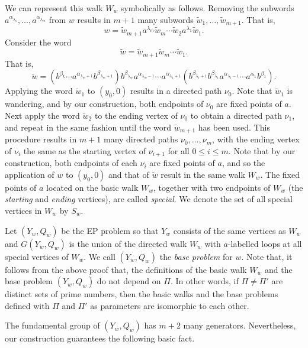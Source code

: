 \documentclass[10pt,a4paper]{amsart}
\theoremstyle{definition}
\theoremstyle{definition}
\numberwithin{equation}{section}
\begin{document}
We can represent this walk $W_w$ symbolically as follows. Removing the subwords $a^{\alpha_{\lambda_1}}, \dots, a^{\alpha_{\lambda_m}}$ from $w$ results in $m+1$ many subwords $\tilde{w}_1, \dots, \tilde{w}_{m+1}$. That is,
$$ w=\tilde{w}_{m+1}a^{\lambda_m}\tilde{w}_m\cdots \tilde{w}_2a^{\lambda_1}\tilde{w}_1. $$
Consider the word
$$ \tilde{w}=\tilde{w}_{m+1}\tilde{w}_m\cdots \tilde{w}_1. $$
That is,
\begin{equation}\label{eqn:tildew} \tilde{w}=(b^{\beta_k}\cdots a^{\alpha_{\lambda_m+1}}b^{\beta_{\lambda_m+1}})b^{\beta_{\lambda_m}}a^{\alpha_{\lambda_m-1}}\cdots a^{\alpha_{\lambda_1+1}}(b^{\beta_{\lambda_1+1}}b^{\beta_{\lambda_1}}a^{\alpha_{\lambda_1-1}}\cdots a^{\alpha_1}b^{\beta_1}). \end{equation}
Applying the word $\tilde{w}_1$ to $(y_0, 0)$ results in a directed path $\nu_0$. Note that $\tilde{w}_1$ is wandering, and by our construction, both endpoints of $\nu_0$ are fixed points of $a$. Next apply the word $\tilde{w}_2$ to the ending vertex of $\nu_0$ to obtain a directed path $\nu_1$, and repeat in the same fashion until the word $\tilde{w}_{m+1}$ has been used. This procedure results in $m+1$ many directed paths $\nu_0,\dots, \nu_{m}$, with the ending vertex of $\nu_i$ the same as the starting vertex of $\nu_{i+1}$ for all $0\leq i\leq m$. Note that by our construction, both endpoints of each $\nu_i$ are fixed points of $a$, and so the application of $w$ to $(y_0,0)$ and that of $\tilde{w}$ result in the same walk $W_w$. The fixed points of $a$ located on the basic walk $W_w$, together with two endpoints of $W_w$ (the {\em starting} and {\em ending} vertices), are called {\em special}. We denote the set of all special vertices in $W_w$ by $S_w$. 



Let $(Y_w, Q_w)$ be the EP problem so that $Y_w$ consists of the same vertices as $W_w$ and $G(Y_w, Q_w)$ is the union of the directed walk $W_w$ with $a$-labelled loops at all special vertices of $W_w$. We call $(Y_w, Q_w)$ the {\em base problem} for $w$. Note that, it follows from the above proof that, the definitions of the basic walk $W_w$ and the base problem $(Y_w, Q_w)$ do not depend on $\Pi$. In other words, if $\Pi\neq \Pi'$ are distinct sets of prime numbers, then the basic walks and the base problems defined with $\Pi$ and $\Pi'$ as parameters are isomorphic to each other. 


The fundamental group of $(Y_w, Q_w)$ has $m+2$ many generators. Nevertheless, our construction guarantees the following basic fact.
\end{document}
